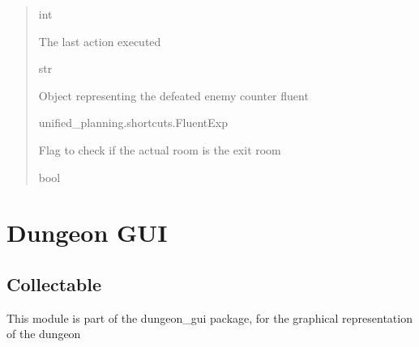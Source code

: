 \documentclass[letterpaper,10pt,english]{sphinxmanual}
\begin{document}
\begin{fulllineitems}
\begin{quote}
\begin{description}
\sphinxAtStartPar
int

\sphinxAtStartPar
The last action executed

\sphinxAtStartPar
str

\sphinxAtStartPar
Object representing the defeated enemy counter fluent

\sphinxAtStartPar
unified\_planning.shortcuts.FluentExp

\sphinxAtStartPar
Flag to check if the actual room is the exit room

\sphinxAtStartPar
bool

\end{description}\end{quote}

\end{fulllineitems}


\sphinxstepscope


\section{Dungeon GUI}
\label{\detokenize{api_reference/dungeon_gui:dungeon-gui}}\label{\detokenize{api_reference/dungeon_gui::doc}}
\sphinxstepscope


\subsection{Collectable}
\label{\detokenize{api_reference/dungeon_gui/collectable:module-collectable}}\label{\detokenize{api_reference/dungeon_gui/collectable:collectable}}\label{\detokenize{api_reference/dungeon_gui/collectable::doc}}
\sphinxAtStartPar
This module is part of the dungeon\_gui package, for the graphical representation of the dungeon
\end{document}
